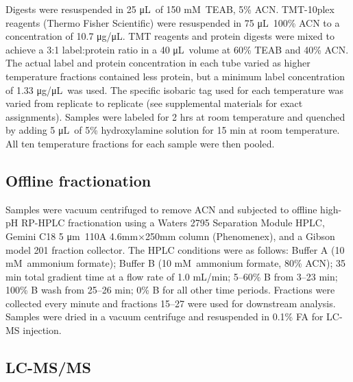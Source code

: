 \documentclass[11pt,letter]{article}\usepackage[]{graphicx}\usepackage[]{color}
\newcommand{\micro}{μ}
\newcommand{\milli}{m}
\newcommand{\gram}{g}
\newcommand{\liter}{L}
\newcommand{\meter}{m}
\newcommand{\molar}{\textsc{M}}
\begin{document}
Digests were resuspended in 25 \micro\liter\ of 150 \milli\molar\ TEAB, 5\%
ACN. TMT-10plex reagents (Thermo Fisher Scientific) were resuspended in 75
\micro\liter\ 100\% ACN to a concentration of 10.7 \micro\gram/\micro\liter.
TMT reagents and protein digests were mixed to achieve a 3:1 label:protein
ratio in a 40 \micro\liter\ volume at 60\% TEAB and 40\% ACN. The actual label
and protein concentration in each tube varied as higher temperature fractions
contained less protein, but a minimum label concentration of 1.33
\micro\gram/\micro\liter\ was used. The specific isobaric tag used for each
temperature was varied from replicate to replicate (see supplemental materials
for exact assignments). Samples were labeled for 2 hrs at room temperature and
quenched by adding 5 \micro\liter\ of 5\% hydroxylamine solution for 15 min at
room temperature. All ten temperature fractions for each sample were then
pooled.

\subsection*{Offline fractionation}

Samples were vacuum centrifuged to remove ACN and subjected to offline high-pH
RP-HPLC fractionation using a Waters 2795 Separation Module HPLC, Gemini C18 5
\micro\meter\ 110A 4.6mm×250mm column (Phenomenex), and a Gibson model 201
fraction collector. The HPLC conditions were as follows: Buffer A (10
\milli\molar\ ammonium formate); Buffer B (10 \milli\molar\ ammonium formate,
80\% ACN); 35 min total gradient time at a flow rate of 1.0 \milli\liter/min;
5--60\% B from 3--23 min; 100\% B wash from 25--26 min; 0\% B for all other
time periods. Fractions were collected every minute and fractions 15--27 were
used for downstream analysis. Samples were dried in a vacuum centrifuge and
resuspended in 0.1\% FA for LC-MS injection.

\subsection*{LC-MS/MS}
\end{document}
